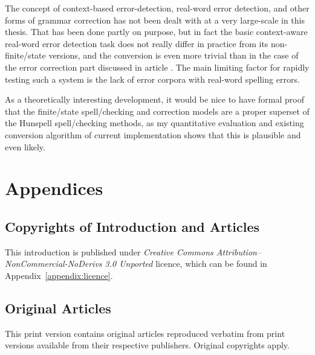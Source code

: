 \documentclass[officiallayout,final]{unihelcompling}
\newif\ifprintversion
\begin{document}
The concept of context-based error-detection, real-word error detection, and
other forms of grammar correction has not been dealt with at a very large-scale
in this thesis. That has been done partly on purpose, but in fact the basic
context-aware real-word error detection task does not really differ in practice
from its non-finite\-/state versions, and the conversion is even more trivial
than in the case of the error correction part discussed in article
. The main limiting factor for rapidly testing
such a system is the lack of error corpora with real-word spelling errors.

As a theoretically interesting development, it would be nice to have formal
proof that the finite\-/state spell\-/checking and correction models are a
proper superset of the Hunspell spell\-/checking methods, as my quantitative
evaluation and existing conversion algorithm of current implementation shows
that this is plausible and even likely.






\appendix
\chapter{Appendices}
\section{Copyrights of Introduction and Articles}
\label{appendix:copyrights}

This introduction is published under \emph{Creative Commons
Attribution–NonCommercial-NoDerivs 3.0 Unported} licence, which can be found in
Appendix~\ref{appendix:licence}. 
\ifprintversion
The articles included
in this print version, reproduced without changes from their originals are
copyrighted property of their respective publishers.
\fi

\section{Original Articles}
\label{appendix:articles}

\ifprintversion
This print version contains original articles reproduced verbatim from print
versions available from their respective publishers. Original copyrights apply.











\end{document}

